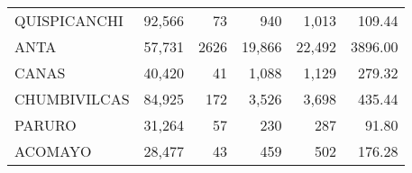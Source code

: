 \begin{tabular}{lrrrrr}
	\cellcolor[HTML]{FFFC9E}QUISPICANCHI                                               & 92,566                                                         & 73                                                       & 940                                                      & 1,013                                                               & 109.44                                                                       \\
	\cellcolor[HTML]{FFFC9E}ANTA                                                       & 57,731                                                         & 2626                                                     & 19,866                                                   & 22,492                                                              & 3896.00                                                                      \\
	\cellcolor[HTML]{FFFC9E}CANAS                                                      & 40,420                                                         & 41                                                       & 1,088                                                    & 1,129                                                               & 279.32                                                                       \\
	\cellcolor[HTML]{9AFF99}CHUMBIVILCAS                                               & 84,925                                                         & 172                                                      & 3,526                                                    & 3,698                                                               & 435.44                                                                       \\
	\cellcolor[HTML]{9AFF99}PARURO                                                     & 31,264                                                         & 57                                                       & 230                                                      & 287                                                                 & 91.80                                                                        \\
	\cellcolor[HTML]{9AFF99}ACOMAYO                                                    & 28,477                                                         & 43                                                       & 459                                                      & 502                                                                 & 176.28                                                                       \\

\end{tabular}
